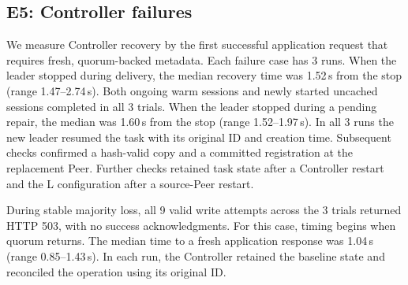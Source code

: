 \subsection{E5: Controller failures}
We measure Controller recovery by the first successful application request
that requires fresh, quorum-backed metadata. Each failure case has 3 runs.
When the leader stopped during delivery, the median recovery time was
1.52\,s from the stop (range 1.47--2.74\,s). Both ongoing warm sessions
and newly started uncached sessions completed in all 3 trials.
When the leader stopped during a pending repair,
the median was 1.60\,s from the stop (range 1.52--1.97\,s). In all
3 runs the new leader resumed the task with its original ID and creation
time. Subsequent checks confirmed a hash-valid copy and a committed
registration at the replacement Peer.
Further checks retained task state after a Controller restart and
the L configuration after a source-Peer restart.

During stable majority loss, all 9 valid write attempts across the 3 trials
returned HTTP 503, with no success acknowledgments.
For this case, timing begins when quorum returns. The median time to a
fresh application response was 1.04\,s (range 0.85--1.43\,s). In each
run, the Controller retained the baseline state and reconciled the
operation using its original ID.
